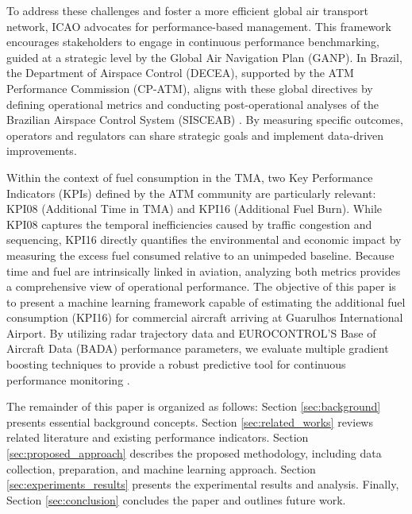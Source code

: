 \documentclass[lettersize,journal]{IEEEtran}
\begin{document}
To address these challenges and foster a more efficient global air transport network, ICAO advocates for performance-based management. This framework encourages stakeholders to engage in continuous performance benchmarking, guided at a strategic level by the Global Air Navigation Plan (GANP). In Brazil, the Department of Airspace Control (DECEA), supported by the ATM Performance Commission (CP-ATM), aligns with these global directives by defining operational metrics and conducting post-operational analyses of the Brazilian Airspace Control System (SISCEAB) \cite{mca10022}. By measuring specific outcomes, operators and regulators can share strategic goals and implement data-driven improvements.

Within the context of fuel consumption in the TMA, two Key Performance Indicators (KPIs) defined by the ATM community are particularly relevant: KPI08 (Additional Time in TMA) and KPI16 (Additional Fuel Burn). While KPI08 captures the temporal inefficiencies caused by traffic congestion and sequencing, KPI16 directly quantifies the environmental and economic impact by measuring the excess fuel consumed relative to an unimpeded baseline. Because time and fuel are intrinsically linked in aviation, analyzing both metrics provides a comprehensive view of operational performance. The objective of this paper is to present a machine learning framework capable of estimating the additional fuel consumption (KPI16) for commercial aircraft arriving at Guarulhos International Airport. By utilizing radar trajectory data and EUROCONTROL'S Base of Aircraft Data (BADA) performance parameters, we evaluate multiple gradient boosting techniques to provide a robust predictive tool for continuous performance monitoring \cite{baklacioglu2021fuel}.

The remainder of this paper is organized as follows: Section \ref{sec:background} presents essential background concepts. Section \ref{sec:related_works} reviews related literature and existing performance indicators. Section \ref{sec:proposed_approach} describes the proposed methodology, including data collection, preparation, and machine learning approach. Section \ref{sec:experiments_results} presents the experimental results and analysis. Finally, Section \ref{sec:conclusion} concludes the paper and outlines future work.









\end{document}
